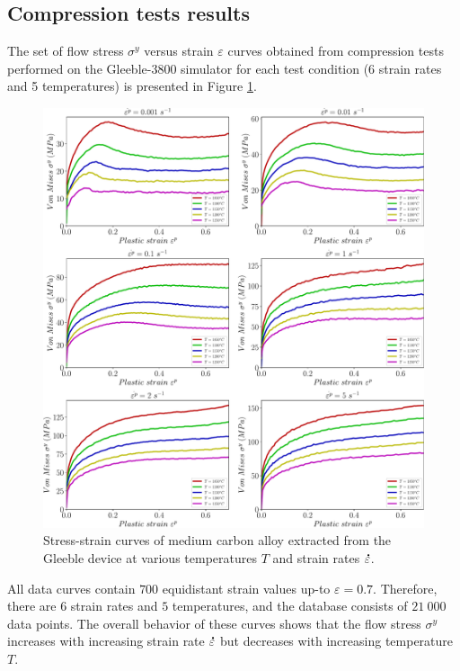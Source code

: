 \documentclass[twoside,english,1p,final,sort&compress]{elsarticle}
\theoremstyle{plain}
\DeclareRobustCommand{\mdot}[1]{\accentset{\mbox{\bfseries .}}{#1}}
\begin{document}
\subsection{Compression tests results\label{sec:ComTestResults}}

The set of flow stress $\sigma^y$ versus strain $\varepsilon$ curves obtained from compression tests performed on the Gleeble-3800 simulator for each test condition (6 strain rates and 5 temperatures) is presented in Figure \ref{fig:RawData}.
\begin{figure}[!ht]
\centering
\includegraphics[width=\columnwidth]{Figures/rawData}
\caption{Stress-strain curves of medium carbon alloy extracted from the Gleeble device at various temperatures $T$ and strain rates $\mdot\varepsilon$.}
\label{fig:RawData}
\end{figure}
All data curves contain $700$ equidistant strain values up-to $\varepsilon=0.7$.
Therefore, there are $6$ strain rates and $5$ temperatures, and the database consists of $21~000$ data points.
The overall behavior of these curves shows that the flow stress $\sigma^y$ increases with increasing strain rate $\mdot\varepsilon$ but decreases with increasing temperature $T$.
\end{document}
